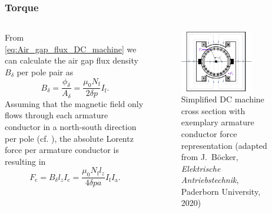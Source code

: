 \begin{frame}
	\frametitle{Torque}
	\begin{columns}
	\begin{column}{0.45\textwidth}
    From \eqref{eq:Air_gap_flux_DC_machine} we can calculate the air gap flux density $B_\delta$ per pole pair as
	\begin{equation}
		B_\delta = \frac{\phi_\delta}{A_\delta} = \frac{\mu_0 N_\mathrm{f}}{2 \delta p} I_\mathrm{f}.
		\label{eq:Air_gap_flux_density_DC_machine}
	\end{equation}\pause
	Assuming that the magnetic field only flows through each armature conductor in a north-south direction per pole (cf. ), the absolute Lorentz force per armature conductor is resulting in
	\begin{equation}
		F_\mathrm{c} =  B_\delta l_z I_\mathrm{c}= \frac{\mu_0 N_\mathrm{f} l_z}{4 \delta p a}I_\mathrm{f} I_\mathrm{a}.
		\label{eq:Lorentz_force_DC_machine_conductor}
	\end{equation}
\end{column}
\hfill
\begin{column}{0.55\textwidth}
	\begin{figure}
		\centering
		\includegraphics[width=0.725\textwidth]{fig/lec03/DC_machine_cross_section_force_torque.pdf}
		\caption{Simplified DC machine cross section with exemplary armature conductor force representation (adapted from J.~B\"ocker, \textit{Elektrische Antriebstechnik}, Paderborn University, 2020)}
		\label{fig:DC_machine_cross_section_force_torque}
	\end{figure}
\end{column}
\end{columns}
\end{frame}

